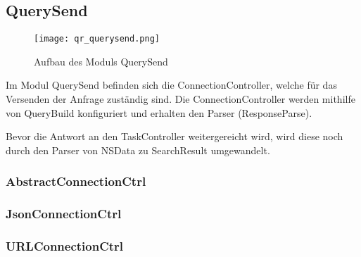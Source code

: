
\subsection{QuerySend}

\begin{figure}[htb]
  	\texttt{[image: qr\_querysend.png]}
  	\caption{Aufbau des Moduls QuerySend}
	\label{fig:Aufbau des Moduls QuerySend}
\end{figure}

Im Modul QuerySend befinden sich die ConnectionController, welche für das Versenden der Anfrage zuständig sind. Die ConnectionController werden mithilfe von QueryBuild konfiguriert und erhalten den Parser (ResponseParse).

Bevor die Antwort an den TaskController weitergereicht wird, wird diese noch durch den Parser von NSData zu SearchResult umgewandelt.

\subsubsection{AbstractConnectionCtrl}
\subsubsection{JsonConnectionCtrl}
\subsubsection{URLConnectionCtrl}

